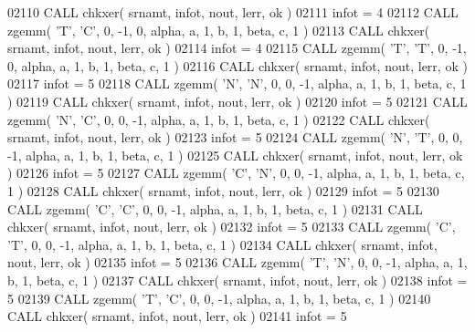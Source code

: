 \begin{DoxyCode}
02110       \textcolor{keyword}{CALL }chkxer( srnamt, infot, nout, lerr, ok )
02111       infot = 4
02112       \textcolor{keyword}{CALL }zgemm( \textcolor{stringliteral}{'T'}, \textcolor{stringliteral}{'C'}, 0, -1, 0, alpha, a, 1, b, 1, beta, c, 1 )
02113       \textcolor{keyword}{CALL }chkxer( srnamt, infot, nout, lerr, ok )
02114       infot = 4
02115       \textcolor{keyword}{CALL }zgemm( \textcolor{stringliteral}{'T'}, \textcolor{stringliteral}{'T'}, 0, -1, 0, alpha, a, 1, b, 1, beta, c, 1 )
02116       \textcolor{keyword}{CALL }chkxer( srnamt, infot, nout, lerr, ok )
02117       infot = 5
02118       \textcolor{keyword}{CALL }zgemm( \textcolor{stringliteral}{'N'}, \textcolor{stringliteral}{'N'}, 0, 0, -1, alpha, a, 1, b, 1, beta, c, 1 )
02119       \textcolor{keyword}{CALL }chkxer( srnamt, infot, nout, lerr, ok )
02120       infot = 5
02121       \textcolor{keyword}{CALL }zgemm( \textcolor{stringliteral}{'N'}, \textcolor{stringliteral}{'C'}, 0, 0, -1, alpha, a, 1, b, 1, beta, c, 1 )
02122       \textcolor{keyword}{CALL }chkxer( srnamt, infot, nout, lerr, ok )
02123       infot = 5
02124       \textcolor{keyword}{CALL }zgemm( \textcolor{stringliteral}{'N'}, \textcolor{stringliteral}{'T'}, 0, 0, -1, alpha, a, 1, b, 1, beta, c, 1 )
02125       \textcolor{keyword}{CALL }chkxer( srnamt, infot, nout, lerr, ok )
02126       infot = 5
02127       \textcolor{keyword}{CALL }zgemm( \textcolor{stringliteral}{'C'}, \textcolor{stringliteral}{'N'}, 0, 0, -1, alpha, a, 1, b, 1, beta, c, 1 )
02128       \textcolor{keyword}{CALL }chkxer( srnamt, infot, nout, lerr, ok )
02129       infot = 5
02130       \textcolor{keyword}{CALL }zgemm( \textcolor{stringliteral}{'C'}, \textcolor{stringliteral}{'C'}, 0, 0, -1, alpha, a, 1, b, 1, beta, c, 1 )
02131       \textcolor{keyword}{CALL }chkxer( srnamt, infot, nout, lerr, ok )
02132       infot = 5
02133       \textcolor{keyword}{CALL }zgemm( \textcolor{stringliteral}{'C'}, \textcolor{stringliteral}{'T'}, 0, 0, -1, alpha, a, 1, b, 1, beta, c, 1 )
02134       \textcolor{keyword}{CALL }chkxer( srnamt, infot, nout, lerr, ok )
02135       infot = 5
02136       \textcolor{keyword}{CALL }zgemm( \textcolor{stringliteral}{'T'}, \textcolor{stringliteral}{'N'}, 0, 0, -1, alpha, a, 1, b, 1, beta, c, 1 )
02137       \textcolor{keyword}{CALL }chkxer( srnamt, infot, nout, lerr, ok )
02138       infot = 5
02139       \textcolor{keyword}{CALL }zgemm( \textcolor{stringliteral}{'T'}, \textcolor{stringliteral}{'C'}, 0, 0, -1, alpha, a, 1, b, 1, beta, c, 1 )
02140       \textcolor{keyword}{CALL }chkxer( srnamt, infot, nout, lerr, ok )
02141       infot = 5

\end{DoxyCode}
